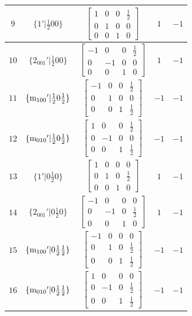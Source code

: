 \documentclass[fleqn,8pt]{jsarticle}
\begin{document}
\begin{longtable}{ccccc}
$ 9 $ & $ \{1{}'|\frac{1}{2} 0 0\} $ & $ \begin{bmatrix} 1 & 0 & 0 & \frac{1}{2} \\ 0 & 1 & 0 & 0 \\ 0 & 0 & 1 & 0 \end{bmatrix} $ & $ 1 $ & $ -1 $ \\ \hline
$ 10 $ & $ \{2{}_{001}{}'|\frac{1}{2} 0 0\} $ & $ \begin{bmatrix} -1 & 0 & 0 & \frac{1}{2} \\ 0 & -1 & 0 & 0 \\ 0 & 0 & 1 & 0 \end{bmatrix} $ & $ 1 $ & $ -1 $ \\ \hline
$ 11 $ & $ \{{\rm m}_{100}{}'|\frac{1}{2} 0 \frac{1}{2}\} $ & $ \begin{bmatrix} -1 & 0 & 0 & \frac{1}{2} \\ 0 & 1 & 0 & 0 \\ 0 & 0 & 1 & \frac{1}{2} \end{bmatrix} $ & $ -1 $ & $ -1 $ \\ \hline
$ 12 $ & $ \{{\rm m}_{010}{}'|\frac{1}{2} 0 \frac{1}{2}\} $ & $ \begin{bmatrix} 1 & 0 & 0 & \frac{1}{2} \\ 0 & -1 & 0 & 0 \\ 0 & 0 & 1 & \frac{1}{2} \end{bmatrix} $ & $ -1 $ & $ -1 $ \\ \hline
$ 13 $ & $ \{1{}'|0 \frac{1}{2} 0\} $ & $ \begin{bmatrix} 1 & 0 & 0 & 0 \\ 0 & 1 & 0 & \frac{1}{2} \\ 0 & 0 & 1 & 0 \end{bmatrix} $ & $ 1 $ & $ -1 $ \\ \hline
$ 14 $ & $ \{2{}_{001}{}'|0 \frac{1}{2} 0\} $ & $ \begin{bmatrix} -1 & 0 & 0 & 0 \\ 0 & -1 & 0 & \frac{1}{2} \\ 0 & 0 & 1 & 0 \end{bmatrix} $ & $ 1 $ & $ -1 $ \\ \hline
$ 15 $ & $ \{{\rm m}_{100}{}'|0 \frac{1}{2} \frac{1}{2}\} $ & $ \begin{bmatrix} -1 & 0 & 0 & 0 \\ 0 & 1 & 0 & \frac{1}{2} \\ 0 & 0 & 1 & \frac{1}{2} \end{bmatrix} $ & $ -1 $ & $ -1 $ \\ \hline
$ 16 $ & $ \{{\rm m}_{010}{}'|0 \frac{1}{2} \frac{1}{2}\} $ & $ \begin{bmatrix} 1 & 0 & 0 & 0 \\ 0 & -1 & 0 & \frac{1}{2} \\ 0 & 0 & 1 & \frac{1}{2} \end{bmatrix} $ & $ -1 $ & $ -1 $ \\
\end{longtable}
\end{document}
